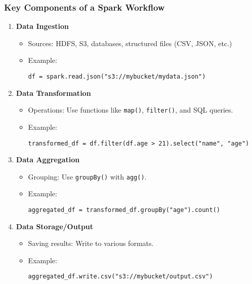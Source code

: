 \documentclass[aspectratio=169]{beamer}
\begin{document}
\begin{frame}[fragile]
    \frametitle{Key Components of a Spark Workflow}
    \begin{enumerate}
        \item \textbf{Data Ingestion}
        \begin{itemize}
            \item Sources: HDFS, S3, databases, structured files (CSV, JSON, etc.)
            \item Example:
            \begin{lstlisting}
df = spark.read.json("s3://mybucket/mydata.json")
            \end{lstlisting}
        \end{itemize}

        \item \textbf{Data Transformation}
        \begin{itemize}
            \item Operations: Use functions like \texttt{map()}, \texttt{filter()}, and SQL queries.
            \item Example:
            \begin{lstlisting}
transformed_df = df.filter(df.age > 21).select("name", "age")
            \end{lstlisting}
        \end{itemize}

        \item \textbf{Data Aggregation}
        \begin{itemize}
            \item Grouping: Use \texttt{groupBy()} with \texttt{agg()}.
            \item Example:
            \begin{lstlisting}
aggregated_df = transformed_df.groupBy("age").count()
            \end{lstlisting}
        \end{itemize}

        \item \textbf{Data Storage/Output}
        \begin{itemize}
            \item Saving results: Write to various formats.
            \item Example:
            \begin{lstlisting}
aggregated_df.write.csv("s3://mybucket/output.csv")
            \end{lstlisting}
        \end{itemize}
    \end{enumerate}
\end{frame}
\end{document}
